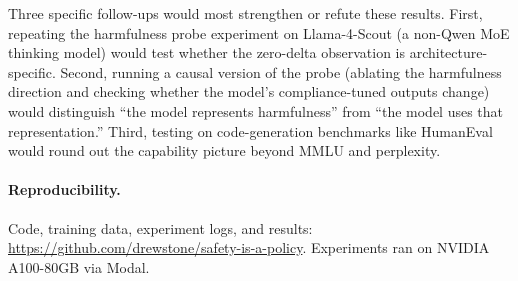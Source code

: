 \documentclass{article}
\begin{document}
Three specific follow-ups would most strengthen or refute these results. First, repeating the harmfulness probe experiment on Llama-4-Scout (a non-Qwen MoE thinking model) would test whether the zero-delta observation is architecture-specific. Second, running a causal version of the probe (ablating the harmfulness direction and checking whether the model's compliance-tuned outputs change) would distinguish ``the model represents harmfulness'' from ``the model uses that representation.'' Third, testing on code-generation benchmarks like HumanEval would round out the capability picture beyond MMLU and perplexity.

\paragraph{Reproducibility.} Code, training data, experiment logs, and results: \url{https://github.com/drewstone/safety-is-a-policy}. Experiments ran on NVIDIA A100-80GB via Modal.
\end{document}

